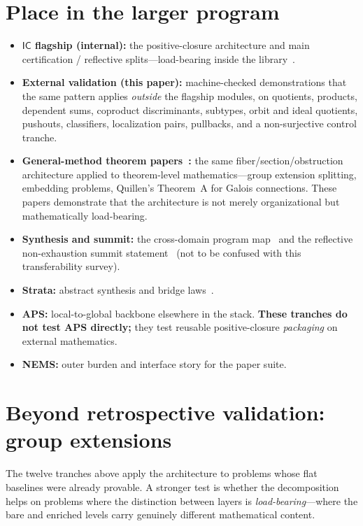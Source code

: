 \documentclass[11pt]{article}
\newcommand{\IC}{\ensuremath{\mathsf{IC}}}
\begin{document}
\section{Place in the larger program}\label{sec:stack}

\begin{itemize}[leftmargin=2em]
  \item \textbf{\IC{} flagship (internal):} the positive-closure architecture and main
    certification / reflective splits---load-bearing inside the library~\cite{SpivackIC}.
  \item \textbf{External validation (this paper):} machine-checked demonstrations that the
    same pattern applies \emph{outside} the flagship modules, on quotients, products, dependent
    sums, coproduct discriminants, subtypes, orbit and ideal quotients, pushouts, classifiers,
    localization pairs, pullbacks, and a non-surjective control tranche.
  \item \textbf{General-method theorem papers~\cite{SpivackFiber,SpivackQuillen}:}
    the same fiber/section/obstruction architecture applied to theorem-level
    mathematics---group extension splitting, embedding problems, Quillen's
    Theorem~A for Galois connections. These papers demonstrate that the
    architecture is not merely organizational but mathematically load-bearing.
  \item \textbf{Synthesis and summit:} the cross-domain program map~\cite{SpivackSynthesis}
    and the reflective non-exhaustion summit statement~\cite{SpivackSummit} (not to be
    confused with this transferability survey).
  \item \textbf{Strata:} abstract synthesis and bridge laws~\cite{SpivackStrata}.
  \item \textbf{APS:} local-to-global backbone elsewhere in the stack. \textbf{These tranches
    do not test APS directly;} they test reusable positive-closure \emph{packaging} on
    external mathematics.
  \item \textbf{NEMS:} outer burden and interface story for the paper suite.
\end{itemize}

\section{Beyond retrospective validation: group extensions}\label{sec:general}

The twelve tranches above apply the architecture to problems whose flat baselines were
already provable. A stronger test is whether the decomposition helps on problems where the
distinction between layers is \emph{load-bearing}---where the bare and enriched levels carry
genuinely different mathematical content.
\end{document}
